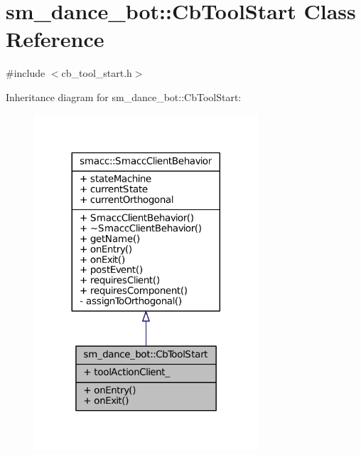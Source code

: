 \hypertarget{classsm__dance__bot_1_1CbToolStart}{}\section{sm\+\_\+dance\+\_\+bot\+:\+:Cb\+Tool\+Start Class Reference}
\label{classsm__dance__bot_1_1CbToolStart}


{\ttfamily \#include $<$cb\+\_\+tool\+\_\+start.\+h$>$}



Inheritance diagram for sm\+\_\+dance\+\_\+bot\+:\+:Cb\+Tool\+Start\+:
\nopagebreak
\begin{figure}[H]
\begin{center}
\leavevmode
\includegraphics[width=236pt]{classsm__dance__bot_1_1CbToolStart__inherit__graph}
\end{center}
\end{figure}


